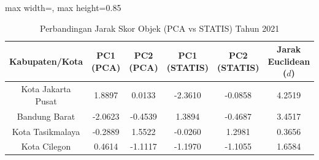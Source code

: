 \begin{table}[H]
\centering
\caption{Perbandingan Jarak Skor Objek (PCA vs STATIS) Tahun 2021} \makeatletter{}\makeatother
\begin{adjustbox}{max width=\textwidth, max height=0.85\textheight}
\begin{tabular}{|c|c|c|c|c|c|}
\hline
\textbf{Kabupaten/Kota} & \textbf{PC1 (PCA)} & \textbf{PC2 (PCA)} & \textbf{PC1 (STATIS)} & \textbf{PC2 (STATIS)} & \textbf{Jarak Euclidean ($d$)} \\
\hline
Kota Jakarta Pusat & 1.8897 & 0.0133 & -2.3610 & -0.0858 & 4.2519 \\
Bandung Barat & -2.0623 & -0.4539 & 1.3894 & -0.4687 & 3.4517 \\
Kota Tasikmalaya & -0.2889 & 1.5522 & -0.0260 & 1.2981 & 0.3656 \\
Kota Cilegon & 0.4614 & -1.1117 & -1.1970 & -1.1055 & 1.6584 \\
\hline
\end{tabular}
\end{adjustbox}
\end{table}
